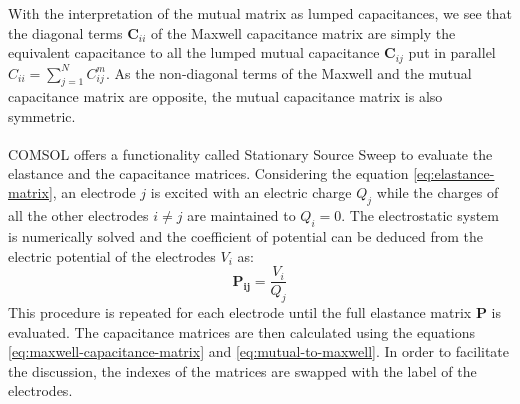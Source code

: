 With the interpretation of the mutual matrix as lumped capacitances, we see that the diagonal terms $\bm{C}_{ii}$ of the Maxwell capacitance matrix are simply the equivalent capacitance to all the lumped mutual capacitance $\bm{C}_{ij}$ put in parallel $C_{ii} = \sum_{j=1}^N C_{ij}^m$. As the non-diagonal terms of the Maxwell and the mutual capacitance matrix are opposite, the mutual capacitance matrix is also symmetric.

COMSOL\textsuperscript{\textregistered} offers a functionality called Stationary Source Sweep to evaluate the elastance and the capacitance matrices. Considering the equation \ref{eq:elastance-matrix}, an electrode $j$ is excited with an electric charge $Q_j$ while the charges of all the other electrodes $i\neq j$ are maintained to $Q_i=0$. The electrostatic system is numerically solved and the coefficient of potential can be deduced from the electric potential of the electrodes $V_i$ as:
\begin{equation}
\bm{P_{ij}} = \frac{V_i}{Q_j}
\end{equation}
This procedure is repeated for each electrode until the full elastance matrix $\bm{P}$ is evaluated. The capacitance matrices are then calculated using the equations \ref{eq:maxwell-capacitance-matrix} and \ref{eq:mutual-to-maxwell}. In order to facilitate the discussion, the indexes of the matrices are swapped with the label of the electrodes. 

